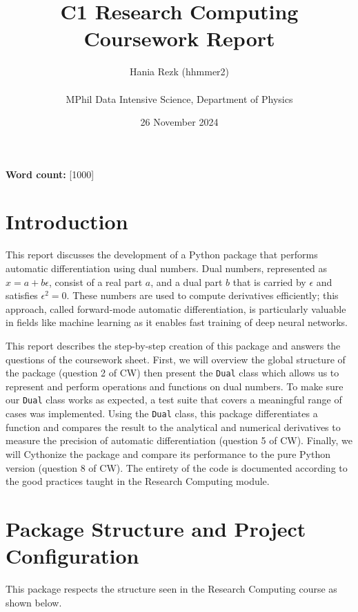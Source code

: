\documentclass[a4paper,12pt]{article}
\title{\Huge \textbf{C1 Research Computing Coursework Report}}
\author{Hania Rezk (hhmmer2) \\ 
\\
MPhil Data Intensive Science, Department of Physics}
\date{26 November 2024}
\begin{document}
\maketitle


\noindent \textbf{Word count:} [1000] \\

\newpage  
\tableofcontents

\newpage  


\section{Introduction}
This report discusses the development of a Python package that performs automatic differentiation using dual numbers. Dual numbers, represented as $x = a + b\epsilon$, consist of a real part $a$, and a dual part $b$ that is carried by $\epsilon$ and satisfies $\epsilon^2 = 0$. These numbers are used to compute derivatives efficiently; this approach, called forward-mode automatic differentiation, is particularly valuable in fields like machine learning as it enables fast training of deep neural networks.

This report describes the step-by-step creation of this package and answers the questions of the coursework sheet. First, we will overview the global structure of the package (question 2 of CW) then present the \texttt{Dual} class which allows us to represent and perform operations and functions on dual numbers. To make sure our \texttt{Dual} class works as expected, a test suite that covers a meaningful range of cases was implemented. Using the \texttt{Dual} class, this package differentiates a function and compares the result to the analytical and numerical derivatives to measure the precision of automatic differentiation (question 5 of CW). Finally, we will Cythonize the package and compare its performance to the pure Python version (question 8 of CW). The entirety of the code is documented according to the good practices taught in the Research Computing module.

\section{Package Structure and Project Configuration}
This package respects the structure seen in the Research Computing course as shown below.
\end{document}
